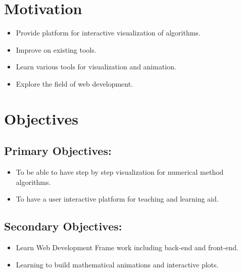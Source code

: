 \documentclass{article}
\begin{document}
\section{Motivation}
\begin{itemize}
    \item Provide platform for interactive visualization of algorithms.
    \item Improve on existing tools.
    \item Learn various tools for visualization and animation.
    \item Explore the field of web development.
\end{itemize}
\section{Objectives}
\subsection{Primary Objectives:}
\begin{itemize}
    \item To be able to have step by step visualization for numerical method algorithms.
    \item To have a user interactive platform for teaching and learning aid.
\end{itemize}
\subsection{Secondary Objectives:}
\begin{itemize}
    \item Learn Web Development Frame work including back-end and front-end.
    \item Learning to build mathematical animations and interactive plots.
\end{itemize}
\end{document}
